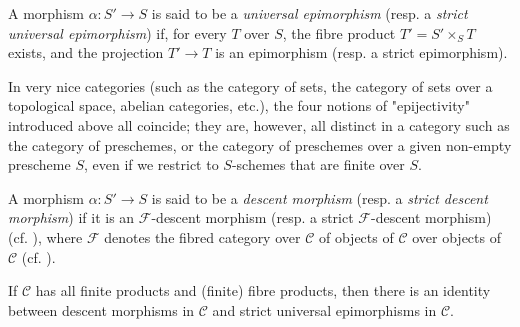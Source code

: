 \begin{definition}\label{fga3.i-a.2-definition-2.3}
    A morphism $\alpha\colon S'\to S$ is said to be a \emph{universal epimorphism} (resp. a \emph{strict universal epimorphism}) if, for every $T$ over $S$, the fibre product $T'=S'\times_S T$ exists, and the projection $T'\to T$ is an epimorphism (resp. a strict epimorphism).
\end{definition}

In very nice categories (such as the category of sets, the category of sets over a topological space, abelian categories, etc.), the four notions of "epijectivity" introduced above all coincide;
they are, however, all distinct in a category such as the category of preschemes, or the category of preschemes over a given non-empty prescheme $S$, even if we restrict to $S$-schemes that are finite over $S$.

\begin{definition}\label{fga3.i-a.2-definition-2.4}
    A morphism $\alpha\colon S'\to S$ is said to be a \emph{descent morphism} (resp. a \emph{strict descent morphism}) if it is an $\mathcal{F}$-descent morphism (resp. a strict $\mathcal{F}$-descent morphism) (cf. ), where $\mathcal{F}$ denotes the fibred category over $\mathcal{C}$ of objects of $\mathcal{C}$ over objects of $\mathcal{C}$ (cf. ).
\end{definition}

\begin{proposition}\label{fga3.i-a.2-proposition-2.1}
    If $\mathcal{C}$ has all finite products and (finite) fibre products, then there is an identity between descent morphisms in $\mathcal{C}$ and strict universal epimorphisms in $\mathcal{C}$.
\end{proposition}

